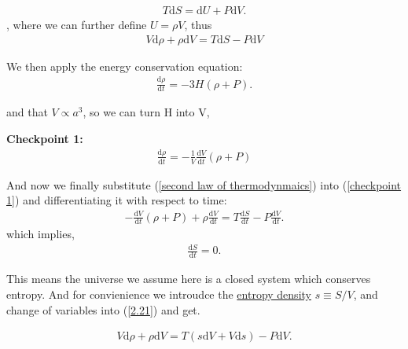 \documentclass[a4paper, 12pt]{article}
\begin{document}
{{        \begin{align}
          \label{second law of thermodynmaics}
          T \mathrm{d}S = \mathrm{d}U + P \mathrm{d}V.
        \end{align}, where we can further define \( U = \rho V \),
        thus 
        \begin{align}
          \label{2nd law in different form}
          V \mathrm{d}\rho + \rho \mathrm{d}V = T \mathrm{d}S - P
          \mathrm{d}V
        \end{align} 
        
        We then apply the energy conservation equation: 
        \begin{align}
          \label{energy conservation equation}
          \frac{\mathrm{d}\rho}{\mathrm{d}t} = -3 H (\rho + P).
        \end{align}
        
        and that \( V \propto a^3 \), so we can turn H into V, 
        
        \textbf{Checkpoint 1:}
        \begin{align}
          \label{checkpoint 1}
          \frac{\mathrm{d}\rho}{\mathrm{d}t} = - \frac{1}{V}
          \frac{\mathrm{d}V}{\mathrm{d}t} (\rho + P)
        \end{align} 
      
        And now we finally substitute (\ref{second law of
        thermodynmaics}) into (\ref{checkpoint 1}) and
        differentiating it with respect to time: 
        \begin{align}
          \label{2.21}
          - \frac{\mathrm{d}V}{\mathrm{d}t} (\rho + P) + \rho
          \frac{\mathrm{d}V}{\mathrm{d}t} = T
          \frac{\mathrm{d}S}{\mathrm{d}t} - P
          \frac{\mathrm{d}V}{\mathrm{d}t}.
        \end{align}
        which implies, 
        \begin{align}
          \label{entropy stays}
          \frac{\mathrm{d}S}{\mathrm{d}t} = 0.
        \end{align}
    
        This means the universe we assume here is a closed system
        which conserves entropy. And for convienience we introudce
        the \underline{entropy density} \( s \equiv S/V \), and
        change of variables into (\ref{2.21}) and get. 

        \begin{align}
          \label{2.23}
          V \mathrm{d}\rho + \rho \mathrm{d}V = T(s \mathrm{d}V + V
          \mathrm{d}s) - P \mathrm{d}V. 
        \end{align}
        
}}
\end{document}
